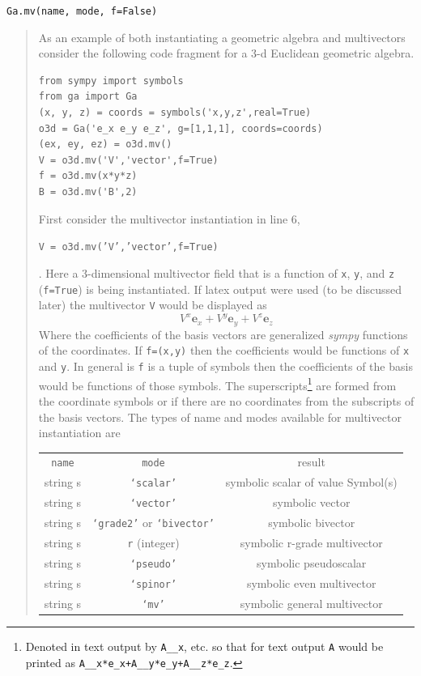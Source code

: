 \documentclass[12pt]{report}
\newcommand{\bm}[1]{\boldsymbol{#1}}
\newcommand{\be}{\begin{equation}}
\newcommand{\ee}{\end{equation}}
\newcommand{\eb}{\bm{e}}
\newcommand{\T}[1]{\texttt{#1}}
\begin{document}
\T{Ga.mv(name, mode, f=False)}
\begin{quote}
As an example of both instantiating a geometric algebra and multivectors consider the
following code fragment for a 3-d Euclidean geometric algebra.
\begin{lstlisting}
from sympy import symbols
from ga import Ga
(x, y, z) = coords = symbols('x,y,z',real=True)
o3d = Ga('e_x e_y e_z', g=[1,1,1], coords=coords)
(ex, ey, ez) = o3d.mv()
V = o3d.mv('V','vector',f=True)
f = o3d.mv(x*y*z)
B = o3d.mv('B',2)
\end{lstlisting}
First consider the multivector instantiation in line 6,\newline
\centerline{\T{V = o3d.mv('V','vector',f=True)}}.\newline
Here
a 3-dimensional multivector field that is a function of \T{x}, \T{y}, and \T{z} (\T{f=True}) is
being instantiated.  If latex output were used (to be discussed later) the multivector
\T{V} would be displayed as
\be
    V^{x}\eb_{x} + V^{y}\eb_{y} + V^{z}\eb_{z}
\ee
Where the coefficients of the basis vectors are generalized \emph{sympy} functions of the
coordinates.  If \T{f=(x,y)} then the coefficients would be functions of \T{x} and \T{y}. 
In general is \T{f} is a tuple of symbols then the coefficients of the basis would be functions of those
symbols.  The superscripts\footnote{Denoted in text output by \T{A\_\_x}, etc. so
that for text output \T{A} would be printed as \T{A\_\_x*e\_x+A\_\_y*e\_y+A\_\_z*e\_z}.} are formed
from the coordinate symbols or if there are no coordinates from the subscripts of
the basis vectors.  The types of name and modes available for multivector instantiation are
\begin{center}
   \begin{tabular}{ccc}
    \T{name} &  \T{mode}  &  result \\
         string s &  \T{`scalar'} & symbolic scalar of value Symbol(s) \\
         string s  &\T{`vector'} &  symbolic vector \\
         string s & \T{`grade2'} or \T{`bivector'} & symbolic bivector \\
         string s &  \T{r} (integer) & symbolic r-grade multivector \\
         string s &  \T{`pseudo'} & symbolic pseudoscalar \\
         string s &  \T{`spinor'} & symbolic even multivector \\
         string s &  \T{`mv'} & symbolic general multivector \\

\end{tabular}
\end{center}
\end{quote}
\end{document}
